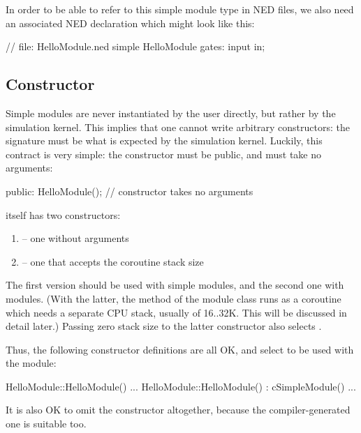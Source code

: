 In order to be able to refer to this simple module type
in NED files, we also need an associated NED declaration which might
look like this:

\begin{ned}
// file: HelloModule.ned
simple HelloModule
{
    gates:
        input in;
}
\end{ned}


\subsection{Constructor}
\label{sec:simple-modules:module-ctor}

Simple modules are never instantiated by the user directly, but rather by
the simulation kernel. This implies that one cannot write arbitrary
constructors: the signature must be what is expected by the simulation kernel.
Luckily, this contract is very simple: the constructor must be public, and must take
no arguments:

\begin{cpp}
  public:
    HelloModule();  // constructor takes no arguments
\end{cpp}

 itself has two constructors:
\begin{enumerate}
  \item{ -- one without arguments}
  \item{ -- one that accepts the coroutine
        stack size}
\end{enumerate}

The first version should be used with  simple modules,
and the second one with  modules.
(With the latter, the  method of the module class
runs as a coroutine which needs a separate CPU stack,
usually of 16..32K. This will be discussed in detail later.)
Passing zero stack size to the latter constructor also selects .

Thus, the following constructor definitions are all OK, and select
 to be used with the module:

\begin{cpp}
HelloModule::HelloModule() {...}
HelloModule::HelloModule() : cSimpleModule() {...}
\end{cpp}

It is also OK to omit the constructor altogether, because the
compiler-generated one is suitable too.

